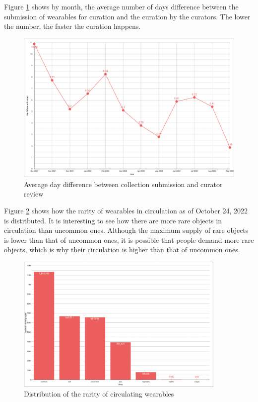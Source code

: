 \documentclass[MSE,Master,english]{twbook}%
\begin{document}
Figure \ref{fig:day_difference} shows by month, the average number of days difference between the submission of wearables for curation and the curation by the curators. The lower the number, the faster the curation happens.
\begin{figure}[H]
  \centering
  \includegraphics[width=\textwidth]{metrics/day_difference.png}
  \caption{Average day difference between collection submission and curator review}
  \label{fig:day_difference}
\end{figure}

Figure \ref{fig:rarity_distribution} shows how the rarity of wearables in circulation as of October 24, 2022 is distributed. It is interesting to see how there are more rare objects in circulation than uncommon ones. Although the maximum supply of rare objects is lower than that of uncommon ones, it is possible that people demand more rare objects, which is why their circulation is higher than that of uncommon ones.
\begin{figure}[H]
  \centering
  \includegraphics[width=0.9\textwidth]{metrics/rarity_distribution.png}
  \caption{Distribution of the rarity of circulating wearables}
  \label{fig:rarity_distribution}
\end{figure}
\end{document}
